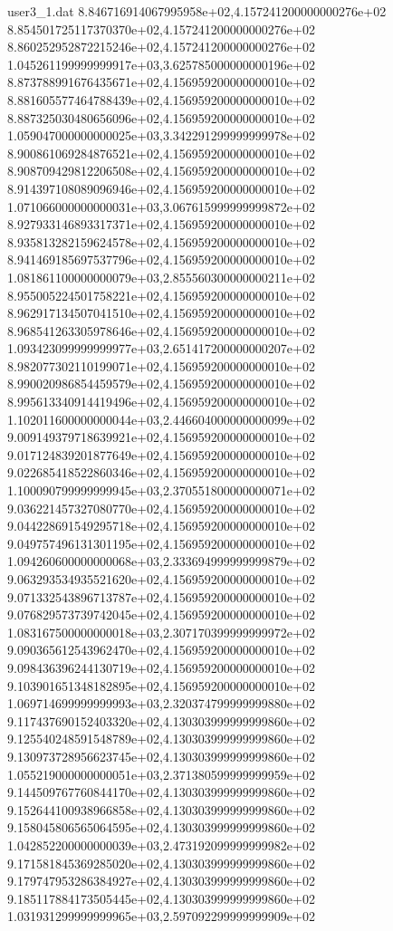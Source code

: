 \begin{filecontents}{user3_1.dat}
8.846716914067995958e+02,4.157241200000000276e+02
8.854501725117370370e+02,4.157241200000000276e+02
8.860252952872215246e+02,4.157241200000000276e+02
1.045261199999999917e+03,3.625785000000000196e+02
8.873788991676435671e+02,4.156959200000000010e+02
8.881605577464788439e+02,4.156959200000000010e+02
8.887325030480656096e+02,4.156959200000000010e+02
1.059047000000000025e+03,3.342291299999999978e+02
8.900861069284876521e+02,4.156959200000000010e+02
8.908709429812206508e+02,4.156959200000000010e+02
8.914397108089096946e+02,4.156959200000000010e+02
1.071066000000000031e+03,3.067615999999999872e+02
8.927933146893317371e+02,4.156959200000000010e+02
8.935813282159624578e+02,4.156959200000000010e+02
8.941469185697537796e+02,4.156959200000000010e+02
1.081861100000000079e+03,2.855560300000000211e+02
8.955005224501758221e+02,4.156959200000000010e+02
8.962917134507041510e+02,4.156959200000000010e+02
8.968541263305978646e+02,4.156959200000000010e+02
1.093423099999999977e+03,2.651417200000000207e+02
8.982077302110199071e+02,4.156959200000000010e+02
8.990020986854459579e+02,4.156959200000000010e+02
8.995613340914419496e+02,4.156959200000000010e+02
1.102011600000000044e+03,2.446604000000000099e+02
9.009149379718639921e+02,4.156959200000000010e+02
9.017124839201877649e+02,4.156959200000000010e+02
9.022685418522860346e+02,4.156959200000000010e+02
1.100090799999999945e+03,2.370551800000000071e+02
9.036221457327080770e+02,4.156959200000000010e+02
9.044228691549295718e+02,4.156959200000000010e+02
9.049757496131301195e+02,4.156959200000000010e+02
1.094260600000000068e+03,2.333694999999999879e+02
9.063293534935521620e+02,4.156959200000000010e+02
9.071332543896713787e+02,4.156959200000000010e+02
9.076829573739742045e+02,4.156959200000000010e+02
1.083167500000000018e+03,2.307170399999999972e+02
9.090365612543962470e+02,4.156959200000000010e+02
9.098436396244130719e+02,4.156959200000000010e+02
9.103901651348182895e+02,4.156959200000000010e+02
1.069714699999999993e+03,2.320374799999999880e+02
9.117437690152403320e+02,4.130303999999999860e+02
9.125540248591548789e+02,4.130303999999999860e+02
9.130973728956623745e+02,4.130303999999999860e+02
1.055219000000000051e+03,2.371380599999999959e+02
9.144509767760844170e+02,4.130303999999999860e+02
9.152644100938966858e+02,4.130303999999999860e+02
9.158045806565064595e+02,4.130303999999999860e+02
1.042852200000000039e+03,2.473192099999999982e+02
9.171581845369285020e+02,4.130303999999999860e+02
9.179747953286384927e+02,4.130303999999999860e+02
9.185117884173505445e+02,4.130303999999999860e+02
1.031931299999999965e+03,2.597092299999999909e+02

\end{filecontents}

